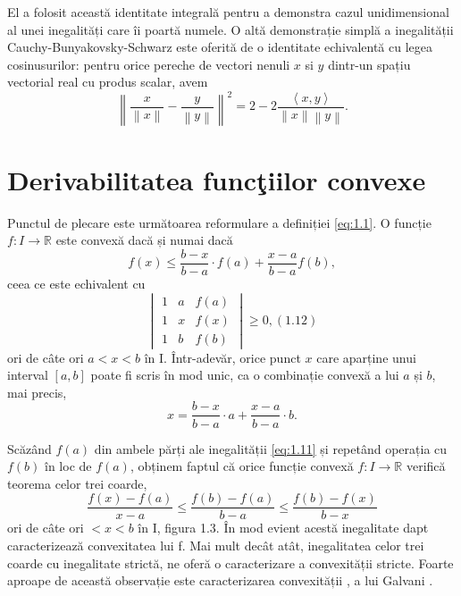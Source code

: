 \documentclass[a4paper,12pt,oneside]{report}
\begin{document}
	El a folosit această identitate integrală pentru a demonstra cazul unidimensional al unei inegalități care îi poartă numele. O altă demonstrație simplă a inegalității Cauchy-Bunyakovsky-Schwarz este oferită  de o identitate echivalentă cu legea cosinusurilor: pentru orice pereche de vectori nenuli \(x\) si \(y\) dintr-un spațiu vectorial real cu produs scalar, avem
\begin{displaymath}
  \left \| \frac{x}{\left \| x \right \|} - \frac{y}{\left \| y \right \|}\right \|^{2} = 2 - 2\frac{\left \langle x , y \right \rangle}{\left \| x \right \|\left \| y \right \|}.
\end{displaymath}

\section{Derivabilitatea func\c{t}iilor convexe}

Punctul de plecare este următoarea reformulare a definiției \ref{eq:1.1}. O funcție \(f : I \rightarrow \mathbb{R}\) este convexă dacă și numai dacă 
\begin{displaymath}
   f\left ( x \right ) \leq \frac{b - x}{b - a} \cdot f\left ( a \right ) + \frac{x- a}{b - a}f\left ( b \right ), \label{eq:1.11} \tag{1.11}
\end{displaymath}
ceea ce este echivalent cu 
\begin{displaymath}
   \begin{vmatrix}
1 &  a& f\left ( a \right )\\ 
 1&  x& f\left ( x \right )\\ 
 1&  b& f\left ( b \right )
\end{vmatrix} \geq 0, (1.12)
\label{eq:1.12} \tag{1.12}
\end{displaymath}
ori de câte ori \(a< x< b\) în I. Într-adevăr,  orice punct \(x\) care aparține unui interval \(\left [ a,b \right ]\) poate fi scris în mod unic, ca o combinație convexă a lui \(a\) și \(b\), mai precis,
\begin{displaymath}
    x = \frac{b - x}{b - a} \cdot a  + \frac{x- a}{b - a}\cdot b.
\end{displaymath}

Scăzând \(f\left ( a \right )\) din ambele părți ale inegalității \ref{eq:1.11} și repetând operația cu \(f\left ( b \right )\) în loc de \(f\left ( a \right )\), obținem faptul că orice funcție convexă \(f : I \rightarrow \mathbb{R}\) verifică teorema celor trei coarde, 
\begin{displaymath}
   \frac{f\left ( x \right ) - f\left ( a \right )}{x-a}\leq \frac{f\left ( b \right )- f\left ( a \right )}{b-a}\leq \frac{f\left ( b \right ) - f\left ( x \right )}{b-x} \label{eq:1.13} \tag{1.13}
\end{displaymath}
ori de câte ori \(< x< b\) în I, figura 1.3. În mod evient acestă inegalitate dapt caracterizează convexitatea lui f. Mai mult decât atât, inegalitatea celor trei coarde cu inegalitate strictă, ne oferă o caracterizare a convexității stricte. Foarte aproape de această observație este caracterizarea convexității , a lui Galvani .
\end{document}
